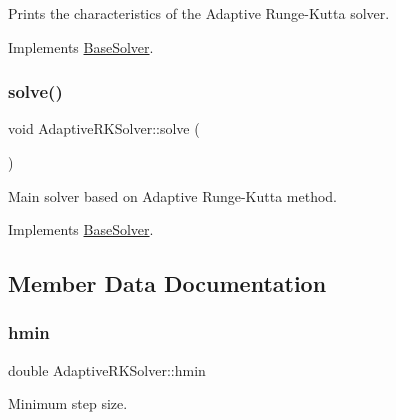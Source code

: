 Prints the characteristics of the Adaptive Runge-\/\+Kutta solver. 



Implements \hyperlink{classBaseSolver_a44725e315b208c0ee69ba8fd5d172e09}{Base\+Solver}.

\mbox{\label{classAdaptiveRKSolver_ad4178bf295f9101b27ca96a92deb8c3e}} 
\subsubsection{\texorpdfstring{solve()}{solve()}}
{\footnotesize\ttfamily void Adaptive\+R\+K\+Solver\+::solve (\begin{DoxyParamCaption}{ }\end{DoxyParamCaption})\hspace{0.3cm}{\ttfamily [virtual]}}



Main solver based on Adaptive Runge-\/\+Kutta method. 



Implements \hyperlink{classBaseSolver_a57f3b4ddec8693c61917aa37a2bac660}{Base\+Solver}.



\subsection{Member Data Documentation}
\mbox{\label{classAdaptiveRKSolver_a771a7c6efdafb13b75ac1f96ef484f46}} 
\subsubsection{\texorpdfstring{hmin}{hmin}}
{\footnotesize\ttfamily double Adaptive\+R\+K\+Solver\+::hmin\hspace{0.3cm}{\ttfamily [private]}}



Minimum step size. 

\mbox{\label{classAdaptiveRKSolver_afc9af0ecd74d4b9a02a6ae5160949d86}} 
